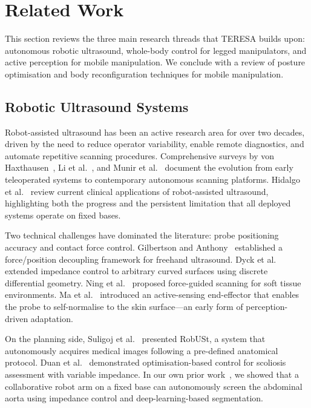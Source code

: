 \section{Related Work}
\label{sec:related_work}

This section reviews the three main research threads that \ac{TERESA} builds
upon: autonomous robotic ultrasound, whole-body control for legged
manipulators, and active perception for mobile manipulation. We conclude with
a review of posture optimisation and body reconfiguration techniques for
mobile manipulation.

\subsection{Robotic Ultrasound Systems}

Robot-assisted ultrasound has been an active research area for over two
decades, driven by the need to reduce operator variability, enable remote
diagnostics, and automate repetitive scanning procedures. Comprehensive
surveys by von Haxthausen~\cite{vonhaxthausen2021}, Li et
al.~\cite{li2021overview}, and Munir et al.~\cite{munir2025} document the
evolution from early teleoperated systems to contemporary autonomous scanning
platforms. Hidalgo et al.~\cite{hidalgo2023} review current clinical
applications of robot-assisted ultrasound, highlighting both the progress and
the persistent limitation that all deployed systems operate on fixed bases.

Two technical challenges have dominated the literature: probe positioning
accuracy and contact force control. Gilbertson and
Anthony~\cite{gilbertson2015} established a force/position decoupling
framework for freehand ultrasound. Dyck et al.~\cite{dyck2022} extended
impedance control to arbitrary curved surfaces using discrete differential
geometry. Ning et al.~\cite{ning2021} proposed force-guided scanning for soft
tissue environments. Ma et al.~\cite{ma2022} introduced an active-sensing
end-effector that enables the probe to self-normalise to the skin
surface---an early form of perception-driven adaptation.

On the planning side, Suligoj et al.~\cite{suligoj2021} presented RobUSt, a
system that autonomously acquires medical images following a pre-defined
anatomical protocol. Duan et al.~\cite{duan2022} demonstrated
optimisation-based control for scoliosis assessment with variable impedance.
In our own prior work~\cite{farsoni2025autonomous}, we showed that a
collaborative robot arm on a fixed base can autonomously screen the abdominal
aorta using impedance control and deep-learning-based segmentation.

